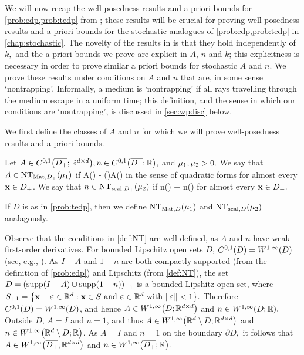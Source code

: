   We will now recap the well-posedness results and a priori bounds for \cref{prob:edp,prob:tedp} from \cite{GrPeSp:19}; these results will be crucial for proving well-posedness results and a priori bounds for the stochastic analogues of \cref{prob:edp,prob:tedp} in \cref{chap:stochastic}. The novelty of the results in \cite{GrPeSp:19} is that they hold independently of $k,$ and the a priori bounds we prove are explicit in $A$, $n$ and $k$; this explicitness is necessary in order to prove similar a priori bounds for stochastic $A$ and $n$. We prove these results under conditions on $A$ and $n$ that are, in some sense `nontrapping'. Informally, a medium is `nontrapping' if all rays travelling through the medium escape in a uniform time; this definition, and the sense in which our conditions are `nontrapping', is discussed in \cref{sec:wpdisc} below.

  We first define the classes of $A$ and $n$ for which we will prove well-posedness results and a priori bounds.%

  
\label{def:NT}
Let $A \in \CzoDpclosRRdtd, n \in \CzoDpclosRR,$ and $\mu_{1}, \mu_{2} > 0.$ We say that $A \in \NTADp{\muo}$ if
\beqs
A(\bx) - \mleft(\bx \cdot \grad\mright)A(\bx) \geq \muo
\eeqs
in the sense of quadratic forms for almost every $\mathbf{x} \in D_{+}$. We say that $n \in \NTnDp{\mut}$ if
\beqs
n(\bx) + \bx \cdot \grad n(\bx) \geq \mut
\eeqs
for almost every $\mathbf{x} \in D_{+}.$

If $D$ is as in \cref{prob:tedp}, then we define $\NTAD{\muo}$ and $\NTnD{\mut}$ analagously.
\ede

Observe that the conditions in \cref{def:NT} are well-defined, as $A$ and $n$ have weak first-order derivatives. For bounded Lipschitz open sets $D$, $\CzoD = \WoiD$ (see, e.g., \cite[Section 4.2.3, Theorem 5]{EvGa:92}). As $I-A$ and $1-n$ are both compactly supported (from the definition of \cref{prob:edp}) and Lipschitz (from \cref{def:NT}), the set $D = \enlargement{\mleft(\supp(I-A) \cup \supp(1-n)\mright)}$ is a bounded Lipshitz open set, where $\enlargement{S} = \set{\bx + \beps \in \RRd \st \bx \in S \tand \beps \in \RRd \twith \N{\beps}<1}.$ Therefore $\CzoD = \WoiD$, and hence $A \in \WoiDRRdtd$ and $n \in \WoiDRR.$ Outside $D$, $A=I$ and $n=1$, and thus $A \in \Woi{\RRd\setminus D;\RRdtd}$ and $n \in \Woi{\RRd\setminus D;\RR}$. As $A=I$ and $n=1$ on the boundary $\partial D,$ it follows that $A \in \WoiDpclosRRdtd$ and $n \in \WoiDpclosRR.$
\ere

